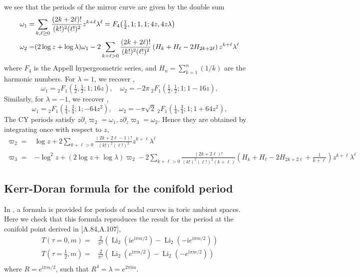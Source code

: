 \documentclass[11pt, a4paper]{article}
\newcommand{\I}{\mathrm{i}}
\newcommand{\Li}{\operatorname{Li}}
\numberwithin{equation}{section}
\begin{document}
we see that the periods of the mirror curve are given by the double sum
\begin{equation}
  \begin{aligned}
  \omega_1 =& \sum_{k,\ell\geq 0} \frac{(2k+2\ell)!}{(k!)^2 (\ell!)^2} z^{k+\ell} \lambda^{\ell} = F_4\qty(\tfrac12, 1; 1, 1; 4 z, 4 z \lambda)  \\
  \omega_2 =& (2\log z+ \log\lambda) \omega_1 - 2  
  \sum_{k+\ell>0} \frac{(2k+2\ell)!}{(k!)^2 (\ell!)^2} 
  \left( H_k + H_\ell - 2 H_{2k+2\ell} \right) 
  z^{k+\ell} \lambda^{\ell}
  \end{aligned}
\end{equation} 
where $F_4$ is the Appell hypergeometric series, and $H_n=\sum_{k=1}^n (1/k)$ are the harmonic numbers. 
For $\lambda=1$, we recover \cite[A.39]{LeFloch:2024cwl}, 
\begin{equation}
\omega_1 = {}_2F_1(\tfrac12,\tfrac12;1;16 z), \quad 
\omega_2 = -2\pi\  {}_2F_1(\tfrac12,\tfrac12;1;1-16 z),
\end{equation} 
Similarly, for $\lambda=-1$, we recover \cite[A.46]{LeFloch:2024cwl}, 
\begin{equation}
\omega_1 = {}_2F_1(\tfrac14,\tfrac34;1;-64z^2), \quad 
\omega_2 = -\pi \sqrt2\  {}_2F_1(\tfrac14,\tfrac34;1;1+64 z^2),
\end{equation} 
The CY periods satisfy $z\partial_z \varpi_2=\omega_1, z\partial_z \varpi_3=\omega_2$.
Hence they are obtained by integrating once with respect to $z$,
\begin{equation}
      \begin{aligned}
  \varpi_2 =& \log z + 
  2 \sum_{k+\ell>0} \frac{(2k+2\ell-1)!}{(k!)^2 (\ell!)^2} z^{k+\ell} \lambda^{\ell} \\
  \varpi_3 =& -\log^2 z 
  +  \left( 2\log z + \log\lambda\right) \varpi_2
   - 2  
  \sum_{k+\ell>0} \frac{(2k+2\ell)!}{(k!)^2 (\ell!)^2 (k+\ell)} 
  \left( H_k + H_\ell - 2 H_{2k+2\ell} + \frac{1}{k+\ell} \right) 
  z^{k+\ell} \lambda^{\ell}
  \end{aligned}
\end{equation}

\subsection{Kerr-Doran formula for the conifold period}

In \cite{kerr2008}, a formula is provided for periods of nodal curves in toric ambient spaces.
Here we check that this formula reproduces the result for the period at the conifold point 
derived in [A.84,A.107]\cite{LeFloch:2024cwl},
\begin{equation}
\begin{aligned}
T(\tau=0,m)= &  \frac{2}{\pi^2} \left( \Li_2( \I e^{\I\pi m/2} ) -  \Li_2(- \I e^{\I\pi m/2} )
\right)\\
T(\tau=\tfrac12,m)= &  \frac{2}{\pi^2} \left( \Li_2( e^{\I\pi m/2} ) -  \Li_2(- e^{\I\pi m/2} )
\right)\\
\end{aligned}
\end{equation}
where $R=e^{\I\pi m/2}$, such that $R^4=\lambda=e^{2\pi\I m}$. 
\end{document}
